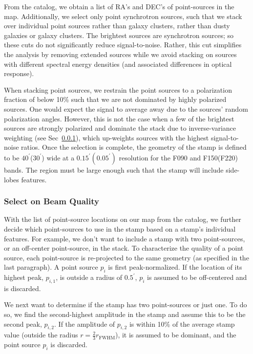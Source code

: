 From the catalog, we obtain a list of RA's and DEC's of point-sources in the map.  Additionally, we select only point synchrotron sources, such that we stack over individual point sources rather than galaxy clusters, rather than dusty galaxies or galaxy clusters.  The brightest sources are synchrotron sources; so these cuts do not significantly reduce signal-to-noise.  Rather, this cut simplifies the analysis by removing extended sources while we avoid stacking on sources with different spectral energy densities (and associated differences in optical response).

When stacking point sources, we restrain the point sources to a polarization fraction of below 10\% such that we are not dominated by highly polarized sources.  One would expect the signal to average away due to the sources’ random polarization angles.  However, this is not the case when a few of the brightest sources are strongly polarized and dominate the stack due to inverse-variance weighting (see Sec~\ref{subsubsec:beamqual_sel}), which up-weights sources with the highest signal-to-noise ratios.  Once the selection is complete, the geometry of the stamp is defined to be $40^{\prime}$($30^{\prime}$) wide at a $0.15^{\prime}(0.05^{\prime})$ resolution for the F090 and F150(F220) bands.  The region must be large enough such that the stamp will include side-lobes features.

\subsubsection{Select on Beam Quality}
\label{subsubsec:beamqual_sel}
With the list of point-source locations on our map from the catalog, we further decide which point-sources to use in the stamp based on a stamp's individual features.  For example, we don't want to include a stamp with two point-sources, or an off-center point-source, in the stack.  To characterize the quality of a point source, each point-source is re-projected to the same geometry (as specified in the last paragraph).  A point source $p_i$ is first peak-normalized.  If the location of its highest peak, $p_{i,1}$, is outside a radius of $0.5^{\prime}$, $p_i$ is assumed to be off-centered and is discarded.  

We next want to determine if the stamp has two point-sources or just one.  To do so, we find the second-highest amplitude in the stamp and assume this to be the second peak, $p_{i,2}$.  If the amplitude of $p_{i,2}$ is within 10\% of the average stamp value (outside the radius $r=\frac{2}{3}r_{\text{FWHM}}$), it is assumed to be dominant, and the point source $p_i$ is discarded.

